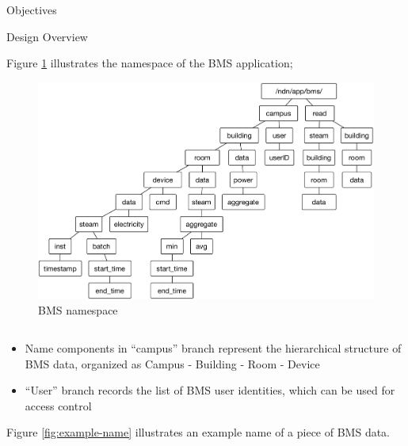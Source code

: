 \documentclass[final,hyperref={pdfpagelabels=false},16pt]{beamer}
\begin{document}
\begin{frame}[t]
\begin{columns}[t]
\begin{column}{.465\textwidth}
\begin{block}{Objectives}

\end{block}


\begin{block}{Design Overview}

Figure \ref{fig:namespace} illustrates the namespace of the BMS application;

\begin{figure}
\includegraphics[width=0.9\linewidth]{bms-namespace}
\caption{BMS namespace}
\label{fig:namespace}
\end{figure}

\begin{columns}[T]

\begin{column}{.42\textwidth}
\begin{itemize}
\item{Name components in ``campus'' branch represent the hierarchical structure of BMS data, organized as Campus - Building - Room - Device}
\item{``User'' branch records the list of BMS user identities, which can be used for access control}
\end{itemize}

\vspace{10mm}

Figure \ref{fig:example-name} illustrates an example name of a piece of BMS data.

\end{column}


\end{columns}
\end{block}
\end{column}
\end{columns}
\end{frame}
\end{document}
